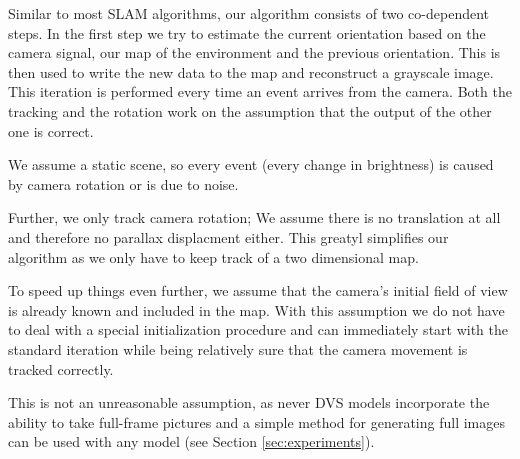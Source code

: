 Similar to most SLAM algorithms, our algorithm consists of two co-dependent
steps. In the first step we try to estimate the current orientation based on
the camera signal, our map of the environment and the previous orientation.
This is then used to write the new data to the map and reconstruct a grayscale
image. This iteration is performed every time an event arrives from the camera.
Both the tracking and the rotation work on the assumption that the output  of
the other one is correct.

We assume a static scene, so every event (every change in brightness) is caused
by camera rotation or is due to noise.

Further, we only track camera rotation; We assume there is no translation at
all and therefore no parallax displacment either. This greatyl simplifies our
algorithm as we only have to keep track of a two dimensional map.

To speed up things even further, we assume that the camera's initial field
of view is already known and included in the map. With this assumption we do
not have to deal with a special initialization procedure and can immediately
start with the standard iteration while being relatively sure that the camera
movement is tracked correctly.

This is not an unreasonable assumption, as never DVS models incorporate the
ability to take full-frame pictures and a simple method for generating full
images can be used with any model (see Section \ref{sec:experiments}).
